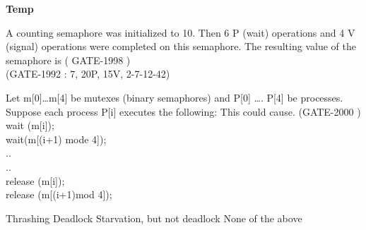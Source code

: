\centerline{\textbf{ \LARGE Temp}}

\setcounter{question}{0}



\begin{minipage}{\linewidth}

  \question  A counting semaphore was initialized to 10. Then 6 P (wait) operations and 4 V (signal) operations were completed on this semaphore. The resulting value of the semaphore is ( GATE-1998 )
  \\ (GATE-1992 :  7, 20P, 15V, 2-7-12-42)
  \begin{choices}
  \end{choices}

  \end{minipage}

\vspace{0.08in}

\begin{minipage}{\linewidth}

  \question   Let m[0]…m[4] be mutexes (binary semaphores) and P[0] …. P[4] be processes.
              Suppose each process P[i] executes the following: This could cause. (GATE-2000 ) \\
              wait (m[i]); \\
              wait(m[(i+1) mode 4]); \\
              ..\\
              ..\\
              release (m[i]);\\
              release (m[(i+1)mod 4]);

  \begin{oneparchoices}
    \choice Thrashing
    \choice Deadlock
    \choice Starvation, but not deadlock
    \choice None of the above
  \end{oneparchoices}

  \end{minipage}

\vspace{0.08in}

